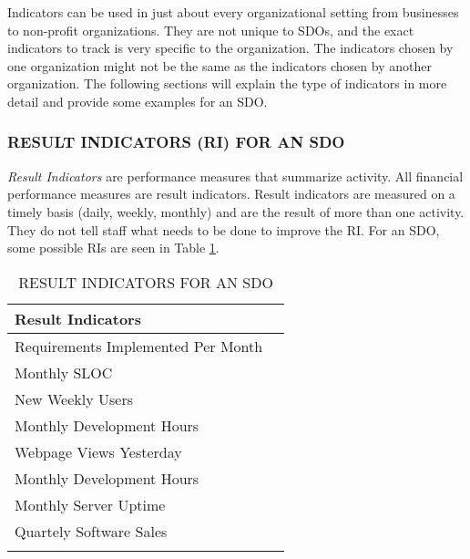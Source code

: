 \documentclass[SDSUThesis.tex]{subfiles}
\begin{document}
        Indicators can be used in just about every organizational
        setting from businesses to non-profit organizations. They
        are not unique to SDOs, and the exact indicators to track
        is very specific to the organization.  The indicators chosen
        by one organization might not be the same as the indicators
        chosen by another organization.  The following sections
        will explain the type of indicators in more detail and provide
        some examples for an SDO.
        
        \subsubsection{RESULT INDICATORS (RI) FOR AN SDO}
            \textit{Result Indicators} are performance 
            measures that summarize activity.  All financial performance
            measures are result indicators.  Result indicators
            are measured on a timely basis (daily, weekly, monthly)
            and are the result of more than one activity.  They do not
            tell staff what needs to be done to improve the RI. For
            an SDO, some possible RIs are seen in Table \ref{tab:RI}.
            
            \begin{longtable}{@{}l l}
                \toprule%
                 \centering%
                 {\bfseries Result Indicators} &
                 \\
                
                \cmidrule[0.4pt](r{0.125em}){1-1}%
                \endhead
                
                Requirements Implemented Per Month  \\
                \myrowcolour%
                Monthly SLOC \\
                New Weekly Users \\
                \myrowcolour%
                Monthly Development Hours \\
                Webpage Views Yesterday \\
                \myrowcolour%
                Monthly Development Hours \\
                Monthly Server Uptime \\
                \myrowcolour%
                Quartely Software Sales \\
                
                \bottomrule
                
                \caption{RESULT INDICATORS FOR AN SDO}
                \label{tab:RI}
            \end{longtable}
            
\end{document}
